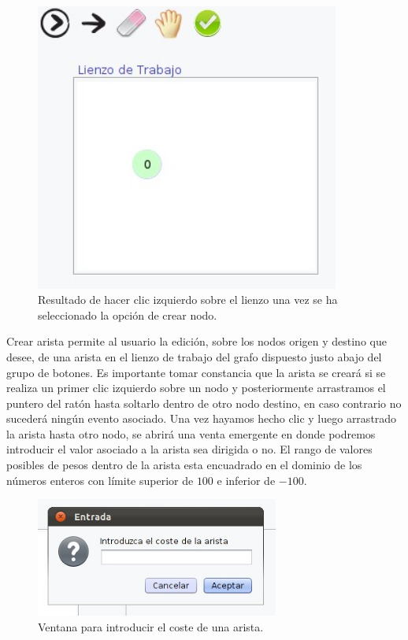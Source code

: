 \begin{figure}[H]
\begin{center}
\includegraphics[width=10cm]{./imagenes_documentacion/imagen_nodo_creado_lienzo.jpeg}
\caption{Resultado de hacer clic izquierdo sobre el lienzo una vez se ha seleccionado la opción de crear nodo.}
\end{center}
\end{figure}

Crear arista permite al usuario la edición, sobre los nodos origen y destino que desee, de una arista en el lienzo de trabajo del grafo dispuesto justo abajo del grupo de botones. Es importante tomar constancia que la arista se creará si se realiza un primer clic izquierdo sobre un nodo y posteriormente arrastramos el puntero del ratón hasta soltarlo dentro de otro nodo destino, en caso contrario no sucederá ningún evento asociado. Una vez hayamos hecho clic y luego arrastrado la arista hasta otro nodo, se abrirá una venta emergente en donde podremos introducir el valor asociado a la arista sea dirigida o no. El rango de valores posibles de pesos dentro de la arista esta encuadrado en el dominio de los números enteros con límite superior de $100$ e inferior de $-100$. \\

\begin{figure}[H]
\begin{center}
\includegraphics[width=8cm]{./imagenes_documentacion/imagen_valor_arista.jpeg}
\caption{Ventana para introducir el coste de una arista.}
\end{center}
\end{figure}

